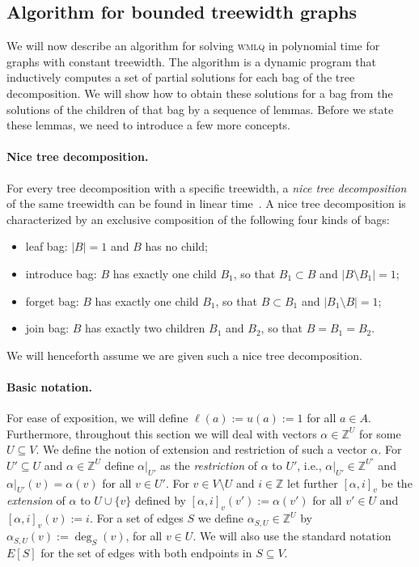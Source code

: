 \documentclass{llncs}
\begin{document}
\subsection{Algorithm for bounded treewidth graphs}

We will now describe an algorithm for solving \textsc{wmlq} in polynomial time for graphs with constant treewidth. The algorithm is a dynamic program that inductively computes a set of partial solutions for each bag of the tree decomposition. We will show how to obtain these solutions for a bag from the solutions of the children of that bag by a sequence of lemmas. Before we state these lemmas, we need to introduce a few more concepts.

\paragraph{Nice tree decomposition.}
For every tree decomposition with a specific treewidth, a \emph{nice tree decomposition}
of the same treewidth can be found in linear time~\cite{Klo94}. A nice tree decomposition
is characterized by an exclusive composition of the following four kinds of bags:
\begin{itemize}
\item leaf bag: $|B| = 1$ and $B$ has no child;
\item introduce bag: $B$ has exactly one child $B_1$, so that $B_1 \subset B$ and $|B \setminus B_1| = 1$;
\item forget bag: $B$ has exactly one child $B_1$, so that $B \subset B_1$ and $|B_1 \setminus B| = 1$;
\item join bag: $B$ has exactly two children $B_1$ and $B_2$, so that $B = B_1 = B_2$.
\end{itemize}
We will henceforth assume we are given such a nice tree decomposition.



\paragraph{Basic notation.}
For ease of exposition, we will define $\ell(a) := u(a) := 1$ for all $a \in A$. Furthermore, throughout this section we will deal with vectors $\alpha \in \mathbb{Z}^U$ for some $U \subseteq V$. We define the notion of extension and restriction of such a vector $\alpha$.
For $U' \subseteq U$ and $\alpha \in \mathbb{Z}^U$ define $\alpha|_{U'}$ as the \emph{restriction} of $\alpha$ to $U'$, i.e., $\alpha|_{U'} \in \mathbb{Z}^{U'}$ and $\alpha|_{U'}(v) = \alpha(v)$ for all $v \in U'$. For $v \in V \setminus U$ and $i \in \mathbb{Z}$ let further $[\alpha, i]_v$ be the \emph{extension} of $\alpha$ to $U \cup \{v\}$ defined by $[\alpha, i]_v(v') := \alpha(v')$ for all $v' \in U$ and $[\alpha, i]_v(v) := i$. 
For a set of edges $S$ we define $\alpha_{S, U} \in \mathbb{Z}^{U}$ by $\alpha_{S, U}(v) := \deg_S(v)$, for all $v\in U$.
We will also use the standard notation $E[S]$ for the set of edges with both endpoints in $S \subseteq V$.
\end{document}
